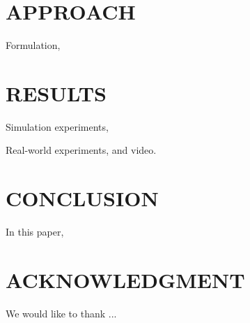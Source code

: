 \documentclass[letterpaper, 10 pt, conference]{ieeeconf}  %
\begin{document}
\section{APPROACH} \label{sec:approach} 

Formulation, 

\section{RESULTS} \label{sec:results} 

Simulation experiments, 

Real-world experiments, and video. 

\section{CONCLUSION} \label{sec:conclusion} 

In this paper, 


\addtolength{\textheight}{-10cm}   %

\section*{ACKNOWLEDGMENT}

We would like to thank ... 





\end{document}
